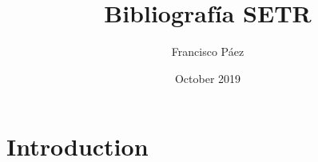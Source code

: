 \documentclass{article}
\title{Bibliografía SETR}
\author{Francisco Páez}
\date{October 2019}
\begin{document}
\maketitle

\section{Introduction}
\end{document}
